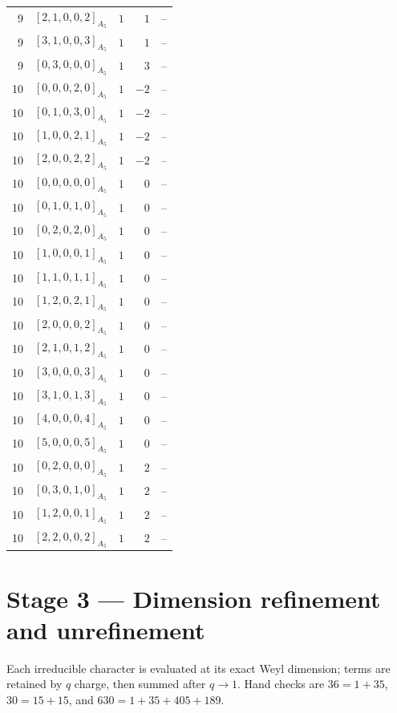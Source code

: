 \documentclass[11pt]{article}
\newcommand{\Dynkin}[1]{#1}
\begin{document}
\begin{longtable}{r l r r l}
9 & $\Dynkin{[2,1,0,0,2]_{A_5}}$ & $1$ & $1$ & --\\
9 & $\Dynkin{[3,1,0,0,3]_{A_5}}$ & $1$ & $1$ & --\\
9 & $\Dynkin{[0,3,0,0,0]_{A_5}}$ & $1$ & $3$ & --\\
10 & $\Dynkin{[0,0,0,2,0]_{A_5}}$ & $1$ & $-2$ & --\\
10 & $\Dynkin{[0,1,0,3,0]_{A_5}}$ & $1$ & $-2$ & --\\
10 & $\Dynkin{[1,0,0,2,1]_{A_5}}$ & $1$ & $-2$ & --\\
10 & $\Dynkin{[2,0,0,2,2]_{A_5}}$ & $1$ & $-2$ & --\\
10 & $\Dynkin{[0,0,0,0,0]_{A_5}}$ & $1$ & $0$ & --\\
10 & $\Dynkin{[0,1,0,1,0]_{A_5}}$ & $1$ & $0$ & --\\
10 & $\Dynkin{[0,2,0,2,0]_{A_5}}$ & $1$ & $0$ & --\\
10 & $\Dynkin{[1,0,0,0,1]_{A_5}}$ & $1$ & $0$ & --\\
10 & $\Dynkin{[1,1,0,1,1]_{A_5}}$ & $1$ & $0$ & --\\
10 & $\Dynkin{[1,2,0,2,1]_{A_5}}$ & $1$ & $0$ & --\\
10 & $\Dynkin{[2,0,0,0,2]_{A_5}}$ & $1$ & $0$ & --\\
10 & $\Dynkin{[2,1,0,1,2]_{A_5}}$ & $1$ & $0$ & --\\
10 & $\Dynkin{[3,0,0,0,3]_{A_5}}$ & $1$ & $0$ & --\\
10 & $\Dynkin{[3,1,0,1,3]_{A_5}}$ & $1$ & $0$ & --\\
10 & $\Dynkin{[4,0,0,0,4]_{A_5}}$ & $1$ & $0$ & --\\
10 & $\Dynkin{[5,0,0,0,5]_{A_5}}$ & $1$ & $0$ & --\\
10 & $\Dynkin{[0,2,0,0,0]_{A_5}}$ & $1$ & $2$ & --\\
10 & $\Dynkin{[0,3,0,1,0]_{A_5}}$ & $1$ & $2$ & --\\
10 & $\Dynkin{[1,2,0,0,1]_{A_5}}$ & $1$ & $2$ & --\\
10 & $\Dynkin{[2,2,0,0,2]_{A_5}}$ & $1$ & $2$ & --\\
\bottomrule\end{longtable}
\section{Stage 3 --- Dimension refinement and unrefinement}
Each irreducible character is evaluated at its exact Weyl dimension; terms are retained by $q$ charge, then summed after $q\to1$. Hand checks are $36=1+35$, $30=15+15$, and $630=1+35+405+189$.
\end{document}
